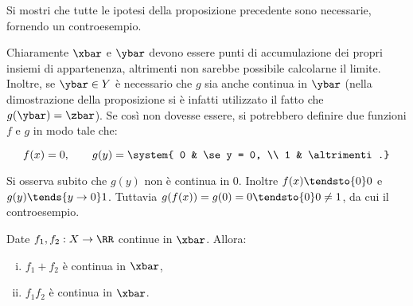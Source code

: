\documentclass[11pt]{article}
\begin{document}
	\begin{exercise}
		Si mostri che tutte le ipotesi della proposizione precedente sono necessarie, fornendo un controesempio.
	\end{exercise}

	\begin{solution}
		Chiaramente $\xbar$ e $\ybar$ devono essere punti di
		accumulazione dei propri insiemi di appartenenza, altrimenti
		non sarebbe possibile calcolarne il limite. \\
		
		Inoltre, se $\ybar \in Y$ è necessario che $g$ sia anche continua in
		$\ybar$ (nella dimostrazione della proposizione si è infatti
		utilizzato il fatto che $g(\ybar) = \zbar$). Se così non dovesse
		essere, si potrebbero definire
		due funzioni $f$ e $g$ in modo tale che:
		
		\[ f(x) = 0, \qquad  g(y) = \system{ 0 & \se y = 0, \\ 1 & \altrimenti.} \]
		
		\vskip 0.05in
		
		Si osserva subito che $g(y)$ non è continua in $0$. Inoltre
		$f(x) \tendsto{0} 0$ e $g(y) \tends{y \to 0} 1$. Tuttavia
		$g(f(x)) = g(0) = 0 \tendsto{0} 0 \neq 1$, da cui il controesempio. 
	\end{solution}

	\begin{proposition}
		Date $f_1, f_2 : X \to \RR$ continue in $\xbar$. Allora:
		
		\begin{enumerate}[(i)]
			\item $f_1 + f_2$ è continua in $\xbar$,
			\item $f_1 f_2$ è continua in $\xbar$.
		\end{enumerate}
	\end{proposition}
\end{document}
